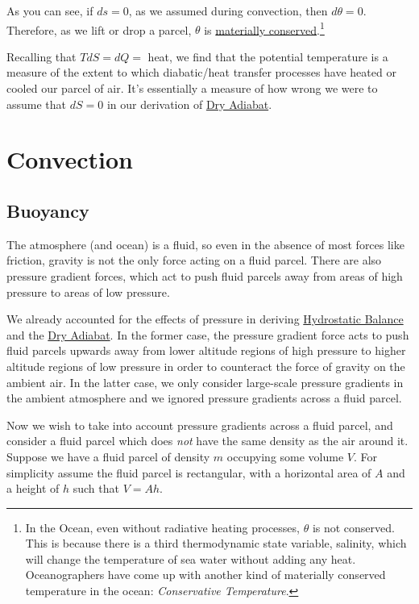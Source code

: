 As you can see, if $ds=0$, as we assumed during convection, then $d\theta=0$. Therefore, as we lift or drop a parcel, $\theta$ is \hyperref[Material Conservation]{materially conserved}.\footnote{In the Ocean, even without radiative heating processes, $\theta$ is not conserved. This is because there is a third thermodynamic state variable, salinity, which will change the temperature of sea water without adding any heat. Oceanographers have come up with another kind of materially conserved temperature in the ocean: \textit{Conservative Temperature}.}

Recalling that $TdS=dQ=$ heat, we find that the potential temperature is a measure of the extent to which diabatic/heat transfer processes have heated or cooled our parcel of air. It's essentially a measure of how wrong we were to assume that $dS=0$ in our derivation of \hyperref[Dry Adiabat]{Dry Adiabat}.

\section{Convection}\label{Convection}

\subsection{Buoyancy}

The atmosphere (and ocean) is a fluid, so even in the absence of most forces like friction, gravity is not the only force acting on a fluid parcel. There are also pressure gradient forces, which act to push fluid parcels away from areas of high pressure to areas of low pressure.

We already accounted for the effects of pressure in deriving \hyperref[Hydrostatic Balance]{Hydrostatic Balance} and the \hyperref[Dry Adiabat]{Dry Adiabat}. In the former case, the pressure gradient force acts to push fluid parcels upwards away from lower altitude regions of high pressure to higher altitude regions of low pressure in order to counteract the force of gravity on the ambient air. In the latter case, we only consider large-scale pressure gradients in the ambient atmosphere and we ignored pressure gradients across a fluid parcel.

Now we wish to take into account pressure gradients across a fluid parcel, and consider a fluid parcel which does \textit{not} have the same density as the air around it. Suppose we have a fluid parcel of density $m$ occupying some volume $V$. For simplicity assume the fluid parcel is rectangular, with a horizontal area of $A$ and a height of $h$ such that $V=Ah$.

